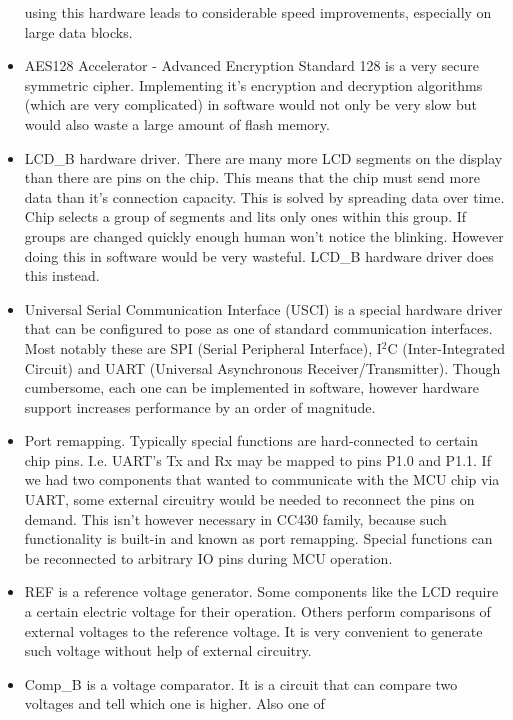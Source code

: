 \begin{commnet}
\begin{itemize}
       using this hardware leads to considerable speed improvements,
       especially on large data blocks.
 \item AES128 Accelerator - Advanced Encryption Standard 128 is a very
       secure symmetric cipher. Implementing it's encryption and
       decryption algorithms (which are very complicated) in software
       would not only be very slow but would also waste a large
       amount of flash memory.
 \item LCD\_B hardware driver. There are many more LCD segments on the
       display than there are pins on the chip. This means that the
       chip must send more data than it's connection capacity. This is
       solved by spreading data over time. Chip selects a group of
       segments and lits only ones within this group. If groups are
       changed quickly enough human won't notice the blinking. However
       doing this in software would be very wasteful. LCD\_B hardware
       driver does this instead.
 \item Universal Serial Communication Interface (USCI) is a special
       hardware driver that can be configured to pose as one of
       standard communication interfaces. Most notably these are SPI
       (Serial Peripheral Interface), I$^2$C (Inter-Integrated Circuit)
       and UART (Universal Asynchronous Receiver/Transmitter). Though
       cumbersome, each one can be implemented in software, however
       hardware support increases performance by an order of
       magnitude.
 \item Port remapping. Typically special functions are hard-connected to
       certain chip pins. I.e. UART's Tx and Rx may be mapped to pins
       P1.0 and P1.1. If we had two components that wanted to
       communicate with the MCU chip via UART, some external circuitry
       would be needed to reconnect the pins on demand. This isn't
       however necessary in CC430 family, because such functionality is
       built-in and known as port remapping. Special functions can
       be reconnected to arbitrary IO pins during MCU operation.
 \item REF is a reference voltage generator. Some components like the
     LCD require a certain electric voltage for their operation.
     Others perform comparisons of external voltages to the reference
     voltage. It is very convenient to generate such voltage without
     help of external circuitry.
 \item Comp\_B is a voltage comparator. It is a circuit that can
     compare two voltages and tell which one is higher. Also one of

\end{itemize}
\end{commnet}
